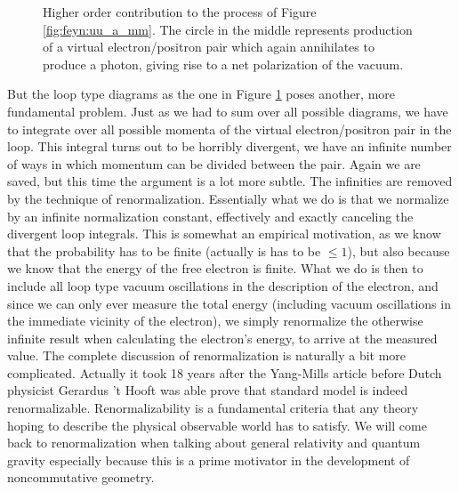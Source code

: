 \begin{figure}[htp]
\centering
	
\caption{Higher order contribution to the process of Figure \ref{fig:feyn:uu_a_mm}. The circle in the middle represents production of a virtual electron/positron pair which again annihilates to produce a photon, giving rise to a net polarization of the vacuum.} \label{fig:feyn:uu_a_mm_2}
\end{figure}

But the loop type diagrams as the one in Figure \ref{fig:feyn:uu_a_mm_2} poses another, more fundamental problem. Just as we had to sum over all possible diagrams, we have to integrate over all possible momenta of the virtual electron/positron pair in the loop. This integral turns out to be horribly divergent, we have an infinite number of ways in which momentum can be divided between the pair. Again we are saved, but this time the argument is a lot more subtle. The infinities are removed by the technique of renormalization. Essentially what we do is that we normalize by an infinite normalization constant, effectively and exactly canceling the divergent loop integrals. This is somewhat an empirical motivation, as we know that the probability has to be finite (actually is has to be $\leq 1$), but also because we know that the energy of the free electron is finite. What we do is then to include all loop type vacuum oscillations in the description of the electron, and since we can only ever measure the total energy (including vacuum oscillations in the immediate vicinity of the electron), we simply renormalize the otherwise infinite result when calculating the electron's energy, to arrive at the measured value. The complete discussion of renormalization is naturally a bit more complicated. Actually it took 18 years after the Yang-Mills article  \cite{yang1954cis} before Dutch physicist Gerardus 't Hooft was able prove  \cite{thooft1972rar} that standard model is indeed renormalizable. Renormalizability is a fundamental criteria that any theory hoping to describe the physical observable world has to satisfy. We will come back to renormalization when talking about general relativity and quantum gravity especially because this is a prime motivator in the development of noncommutative geometry.
